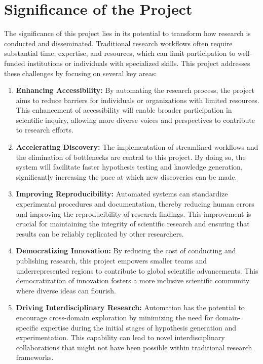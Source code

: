 \section{Significance of the Project}
The significance of this project lies in its potential to transform how research is conducted and disseminated. Traditional research workflows often require substantial time, expertise, and resources, which can limit participation to well-funded institutions or individuals with specialized skills. This project addresses these challenges by focusing on several key areas:
\begin{enumerate}
    \item \textbf{Enhancing Accessibility:} By automating the research process, the project aims to reduce barriers for individuals or organizations with limited resources. This enhancement of accessibility will enable broader participation in scientific inquiry, allowing more diverse voices and perspectives to contribute to research efforts.

    \item \textbf{Accelerating Discovery:} The implementation of streamlined workflows and the elimination of bottlenecks are central to this project. By doing so, the system will facilitate faster hypothesis testing and knowledge generation, significantly increasing the pace at which new discoveries can be made.

    \item \textbf{Improving Reproducibility:} Automated systems can standardize experimental procedures and documentation, thereby reducing human errors and improving the reproducibility of research findings. This improvement is crucial for maintaining the integrity of scientific research and ensuring that results can be reliably replicated by other researchers.

    \item \textbf{Democratizing Innovation:} By reducing the cost of conducting and publishing research, this project empowers smaller teams and underrepresented regions to contribute to global scientific advancements. This democratization of innovation fosters a more inclusive scientific community where diverse ideas can flourish.

    \item \textbf{Driving Interdisciplinary Research:} Automation has the potential to encourage cross-domain exploration by minimizing the need for domain-specific expertise during the initial stages of hypothesis generation and experimentation. This capability can lead to novel interdisciplinary collaborations that might not have been possible within traditional research frameworks.
\end{enumerate}



